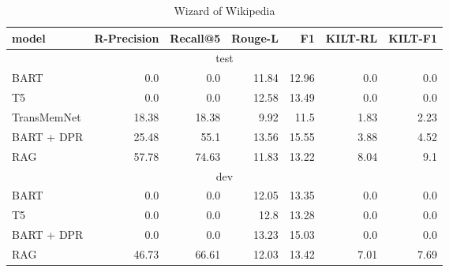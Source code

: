 \documentclass[11pt]{article}
\begin{document}
 \begin{table*}[ht]
\centering
\begin{tabular}{l@{\hskip 2em}rrrrrr}
 \toprule
model & \textbf{R-Precision} & \textbf{Recall@5} & \textbf{Rouge-L} & \textbf{F1}  & \textbf{KILT-RL}  & \textbf{KILT-F1}  \\
\midrule
\multicolumn{7}{c}{test} \\
\midrule
BART & 0.0 & 0.0 & 11.84 & 12.96 & 0.0 & 0.0 \\ 
T5 & 0.0 & 0.0 & 12.58 & 13.49 & 0.0 & 0.0 \\ 
TransMemNet & 18.38 & 18.38 & 9.92 & 11.5 & 1.83 & 2.23 \\
BART + DPR & 25.48 & 55.1 & 13.56 & 15.55 & 3.88 & 4.52 \\ 
RAG & 57.78 & 74.63 & 11.83 & 13.22 & 8.04 & 9.1 \\   
\midrule
\multicolumn{7}{c}{dev} \\
\midrule
BART & 0.0 & 0.0 & 12.05 & 13.35 & 0.0 & 0.0 \\ 
T5 & 0.0 & 0.0 & 12.8 & 13.28 & 0.0 & 0.0 \\ 
BART + DPR & 0.0 & 0.0 & 13.23 & 15.03 & 0.0 & 0.0 \\ 
RAG & 46.73 & 66.61 & 12.03 & 13.42 & 7.01 & 7.69 \\  
\bottomrule
\end{tabular}
\caption{Wizard of Wikipedia}
\label{tab:WoW}
\end{table*}
 
\end{document}
